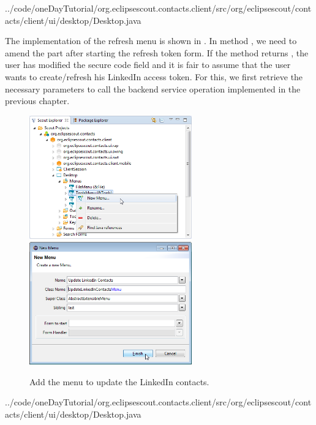 \documentclass[a4paper,10pt,twoside]{book}
\begin{document}

{../code/oneDayTutorial/org.eclipsescout.contacts.client/src/org/eclipsescout/contacts/client/ui/desktop/Desktop.java}

The implementation of the refresh menu is shown in . 
In method , we need to amend the part after starting the refresh token form. 
If the method  returns , the user has modified the secure code field and it is fair to assume that the user wants to create/refresh his LinkedIn access token. 
For this, we first retrieve the necessary parameters to call the backend service operation  implemented in the previous chapter. 

\begin{figure}
\includegraphics[width=7cm]{new_menu_updatecontacts_contextmenu.png} \hspace{5mm}
\includegraphics[width=7cm]{new_menu_updatecontacts.png}
\caption{Add the menu to update the LinkedIn contacts.}
\end{figure}


{../code/oneDayTutorial/org.eclipsescout.contacts.client/src/org/eclipsescout/contacts/client/ui/desktop/Desktop.java}
\end{document}
